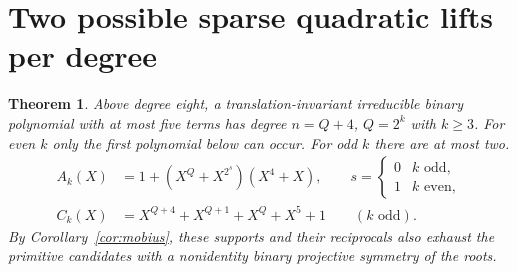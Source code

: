 \documentclass[11pt]{article}
\newtheorem{theorem}{Theorem}
\begin{document}
\clearpage
\section{Two possible sparse quadratic lifts per degree}
\label{sec:two-translation-lifts}

\begin{theorem}
Above degree eight, a translation-invariant irreducible binary
polynomial with at most five terms has degree \(n=Q+4\), \(Q=2^k\)
with \(k\ge3\). For even \(k\) only the first polynomial below can
occur. For odd \(k\) there are at most two.
\[
\begin{aligned}
 A_k(X)&=1+(X^Q+X^{2^s})(X^4+X),\qquad
          s=\begin{cases}0&k\text{ odd},\\1&k\text{ even},\end{cases}\\
 C_k(X)&=X^{Q+4}+X^{Q+1}+X^Q+X^5+1\qquad(k\text{ odd}).
\end{aligned}
\]
By Corollary~\ref{cor:mobius}, these supports and their reciprocals
also exhaust the primitive candidates with a nonidentity binary
projective symmetry of the roots.
\end{theorem}
\end{document}
